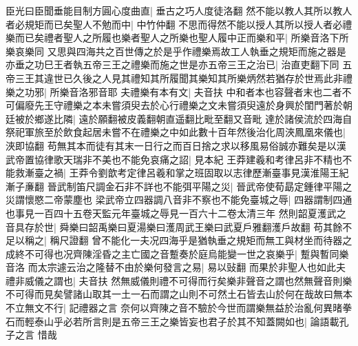 臣光曰臣聞垂能目制方圓心度曲直|{
	垂古之巧人度徒洛翻}
然不能以教人其所以教人者必規矩而已矣聖人不勉而中|{
	中竹仲翻}
不思而得然不能以授人其所以授人者必禮樂而已矣禮者聖人之所履也樂者聖人之所樂也聖人履中正而樂和平|{
	所樂音洛下所樂哀樂同}
又思與四海共之百世傳之於是乎作禮樂焉故工人執垂之規矩而施之器是亦垂之功巳王者執五帝三王之禮樂而施之世是亦五帝三王之治已|{
	治直吏翻下同}
五帝三王其違世已久後之人見其禮知其所履聞其樂知其所樂炳然若猶存於世焉此非禮樂之功邪|{
	所樂音洛邪音耶}
夫禮樂有本有文|{
	夫音扶}
中和者本也容聲者末也二者不可偏廢先王守禮樂之本未嘗須臾去於心行禮樂之文未嘗須臾遠於身興於閨門著於朝廷被於鄉遂比隣|{
	遠於願翻被皮義翻朝直遥翻比毗至翻又音毗}
達於諸侯流於四海自祭祀軍旅至於飲食起居未嘗不在禮樂之中如此數十百年然後治化周浹鳳凰來儀也|{
	浹即協翻}
苟無其本而徒有其末一日行之而百日捨之求以移風易俗誠亦難矣是以漢武帝置協律歌天瑞非不美也不能免哀痛之詔|{
	見本紀}
王莽建羲和考律呂非不精也不能救漸臺之禍|{
	王莽令劉歆考定律呂羲和掌之班固取以志律歷漸臺事見漢淮陽王紀漸子亷翻}
晉武制笛尺調金石非不詳也不能弭平陽之災|{
	晉武帝使荀勗定鍾律平陽之災謂懷愍二帝蒙塵也}
梁武帝立四器調八音非不察也不能免臺城之辱|{
	四器謂制四通也事見一百四十五卷天監元年臺城之辱見一百六十二卷太清三年}
然則韶夏濩武之音具存於世|{
	舜樂曰韶禹樂曰夏湯樂曰濩周武王樂曰武夏戶雅翻濩戶故翻}
苟其餘不足以稱之|{
	稱尺證翻}
曾不能化一夫况四海乎是猶執垂之規矩而無工與材坐而待器之成終不可得也况齊陳淫昏之主亡國之音蹔奏於庭烏能變一世之哀樂乎|{
	蹔與暫同樂音洛}
而太宗遽云治之隆替不由於樂何發言之易|{
	易以䜴翻}
而果於非聖人也如此夫禮非威儀之謂也|{
	夫音扶}
然無威儀則禮不可得而行矣樂非聲音之謂也然無聲音則樂不可得而見矣譬諸山取其一土一石而謂之山則不可然土石皆去山於何在哉故曰無本不立無文不行|{
	記禮器之言}
奈何以齊陳之音不驗於今世而謂樂無益於治亂何異暏拳石而輕泰山乎必若所言則是五帝三王之樂皆妄也君子於其不知蓋闕如也|{
	論語載孔子之言}
惜哉

